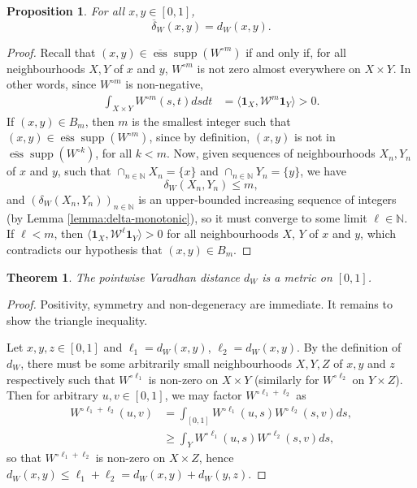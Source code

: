 \documentclass[11pt]{article}
\def\N{\mathbb{N}}
\def\supp{\operatorname{supp}}
\def\ess{\operatorname{ess}}
\def\II{\bm{1}}
\def\calW{\mathcal{W}}
\newtheorem{theorem}{Theorem}[section]
\newtheorem{proposition}{Proposition}[section]
\theoremstyle{definition}
\begin{document}
\begin{proposition} \label{thm:varadhan-pointwise}
    For all $x,y\in [0,1]$, 
    $$\overline{\delta}_W (x,y) = d_W (x,y).$$
\end{proposition}
\begin{proof}
    Recall that $(x,y) \in \overline{\ess} \supp (W^{\circ m})$ if and only if, for all neighbourhoods $X,Y$ of $x$ and $y$, $W^{\circ m}$ is not zero almost everywhere on $X \times Y$. In other words, since $W^{\circ m}$ is non-negative,
    \begin{align*}
        \int_{X \times Y} W^{\circ m} (s,t) ds dt &= \langle \II_X, \calW^m \II_Y \rangle > 0.
    \end{align*}
    If $(x,y) \in B_m$, then $m$ is the smallest integer such that $(x,y) \in \overline{\ess} \supp (W^{\circ m})$, since by definition, $(x,y)$ is not in $\overline{\ess} \supp (W^{\circ k})$, for all $k < m$. Now, given sequences of neighbourhoods $X_n, Y_n$ of $x$ and $y$, such that $\cap_{n\in\N} X_n = \{x\}$ and $\cap_{n\in\N} Y_n = \{y\}$, we have 
    $$\delta_W (X_n,Y_n) \le m,$$ 
    and $(\delta_W (X_n,Y_n))_{n\in\N}$ is an upper-bounded increasing sequence of integers (by Lemma \ref{lemma:delta-monotonic}), so it must converge to some limit $\ell \in \N$. If $\ell < m$, then $\langle \II_X, \calW^\ell \II_Y\rangle >0$ for all neighbourhoods $X$, $Y$ of $x$ and $y$, which contradicts our hypothesis that $(x,y) \in B_m$.
\end{proof}

\begin{theorem}
    The pointwise Varadhan distance $d_W$ is a metric on $[0,1]$.
\end{theorem}
\begin{proof}
    Positivity, symmetry and non-degeneracy are immediate. It remains to show the triangle inequality.

    Let $x,y,z\in [0,1]$ and $\ell_1 = d_W (x,y)$, $\ell_2 = d_W (x,y)$. By the definition of $d_W$, there must be some arbitrarily small neighbourhoods $X, Y, Z$ of $x, y$ and $z$ respectively such that $W^{\circ \ell_1}$ is non-zero on $X\times Y$ (similarly for $W^{\circ \ell_2}$ on $Y\times Z$). Then for arbitrary $u,v \in [0,1]$, we may factor $W^{\circ \ell_1 + \ell_2}$ as
    \begin{align*}
        W^{\circ \ell_1 + \ell_2} (u,v) &= \int_{[0,1]} W^{\circ \ell_1} (u,s) W^{\circ \ell_2} (s,v) ds,\\
        &\ge \int_{Y} W^{\circ \ell_1} (u,s) W^{\circ \ell_2} (s,v) ds,
    \end{align*}
    so that $W^{\circ \ell_1 + \ell_2}$ is non-zero on $X\times Z$, hence $d_W (x,y) \le \ell_1 + \ell_2 = d_W(x,y) + d_W (y,z)$. 
 \end{proof}
\end{document}
